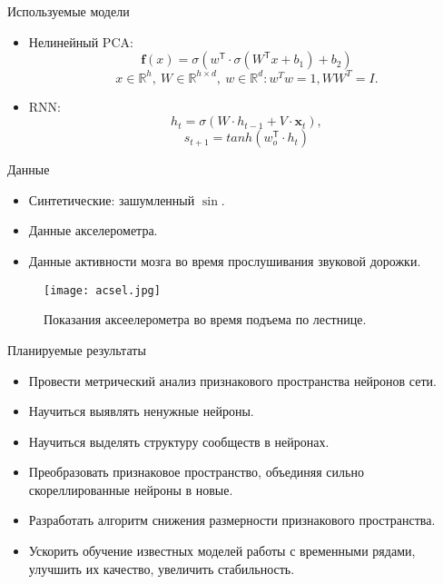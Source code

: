 \documentclass{beamer}
\begin{document}
\begin{frame}{Используемые модели}
    \begin{itemize}
        \item Нелинейный PCA:
            \[\mathbf{f}(x) = \sigma(w^{\mathsf{T}}\cdot \sigma(W^{\mathsf{T}}x + b_1) + b_2)\]
            \[x \in \mathbb{R}^{h}, \ W \in \mathbb{R}^{h \times d}, \ w \in \mathbb{R}^d: w^Tw=1, WW^T=I.\]

        \item RNN:
            \[ h_t = \sigma(W \cdot h_{t-1} + V \cdot \mathbf{x}_t),\]
            \[ s_{t+1} = tanh(w_o^{\mathsf{T}} \cdot h_t)\]
    \end{itemize}
\end{frame}

\begin{frame}{Данные}
    \begin{itemize}
        \item Синтетические: зашумленный $\sin$.
        \item Данные акселерометра.
        \item Данные активности мозга во время прослушивания звуковой дорожки.
    \end{itemize}

    \begin{figure}
    \texttt{[image: acsel.jpg]}
    \caption{Показания аксеелерометра во время подъема по лестнице.}
    \end{figure}
\end{frame}


\begin{frame}{Планируемые результаты}
\begin{itemize}
    \item Провести метрический анализ признакового пространства нейронов сети.
    \item Научиться выявлять ненужные нейроны.
    \item Научиться выделять структуру сообществ в нейронах.
    \item Преобразовать признаковое пространство, объединяя сильно скореллированные нейроны в новые.
    \item Разработать алгоритм снижения размерности признакового пространства.
    \item Ускорить обучение известных моделей работы с временными рядами, улучшить их качество, увеличить стабильность.
\end{itemize}
\end{frame}
    
\end{document}
